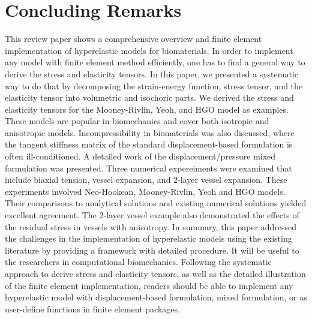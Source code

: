 \section{Concluding Remarks}
\label{conclusions}
This review paper shows a comprehensive overview and finite element implementation of hyperelastic models for biomaterials. In order to implement any model with finite element method efficiently, one has to find a general way to derive the stress and elasticity tensors. In this paper, we presented a systematic way to do that by decomposing the strain-energy function, stress tensor, and the elasticity tensor into volumetric and isochoric parts. We derived the stress and elasticity tensors for the Mooney-Rivlin, Yeoh, and HGO model as examples. These models are popular in biomechanics and cover both isotropic and anisotropic models. Incompressibility in biomaterials was also discussed, where the tangent stiffness matrix of the standard displacement-based formulation is often ill-conditioned. A detailed work of the displacement/pressure mixed formulation was presented. Three numerical expereiments were examined that include biaxial tension, vessel expansion, and $2$-layer vessel expansion. These experiments involved Neo-Hookean, Mooney-Rivlin, Yeoh and HGO models. Their comparisons to analytical solutions and existing numerical solutions yielded excellent agreement. The $2$-layer vessel example also demonstrated the effects of the residual stress in vessels with anisotropy. In summary, this paper addressed the challenges in the implementation of hyperelastic models using the existing literature by providing a framework with detailed procedure. It will be useful to the researchers in computational biomechanics. Following the systematic approach to derive stress and elasticity tensors, as well as the detailed illustration of the finite element implementation, readers should be able to implement any hyperelastic model with displacement-based formulation, mixed formulation, or as user-define functions in finite element packages. 

